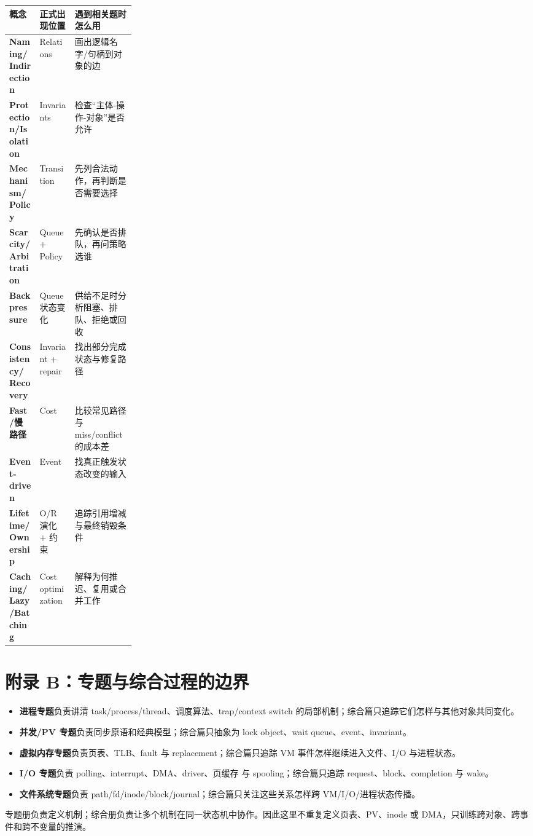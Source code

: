 \documentclass[11pt,a4paper]{ctexart}
\newcommand{\kw}[1]{\textbf{#1}}
\begin{document}
\begin{center}
\small
\begin{tabularx}{\linewidth}{>{\bfseries}p{0.24\linewidth} X X}
\toprule
概念 & 正式出现位置 & 遇到相关题时怎么用 \\
\midrule
Naming/Indirection & Relations & 画出逻辑名字/句柄到对象的边 \\
Protection/Isolation & Invariants & 检查“主体-操作-对象”是否允许 \\
Mechanism/Policy & Transition & 先列合法动作，再判断是否需要选择 \\
Scarcity/Arbitration & Queue + Policy & 先确认是否排队，再问策略选谁 \\
Backpressure & Queue 状态变化 & 供给不足时分析阻塞、排队、拒绝或回收 \\
Consistency/Recovery & Invariant + repair & 找出部分完成状态与修复路径 \\
Fast/慢路径 & Cost & 比较常见路径与 miss/conflict 的成本差 \\
Event-driven & Event & 找真正触发状态改变的输入 \\
Lifetime/Ownership & O/R 演化 + 约束 & 追踪引用增减与最终销毁条件 \\
Caching/Lazy/Batching & Cost optimization & 解释为何推迟、复用或合并工作 \\
\bottomrule
\end{tabularx}
\end{center}

\section{附录 B：专题与综合过程的边界}

\begin{itemize}
  \item \kw{进程专题}负责讲清 task/process/thread、调度算法、trap/context switch 的局部机制；综合篇只追踪它们怎样与其他对象共同变化。
  \item \kw{并发/PV 专题}负责同步原语和经典模型；综合篇只抽象为 lock object、wait queue、event、invariant。
  \item \kw{虚拟内存专题}负责页表、TLB、fault 与 replacement；综合篇只追踪 VM 事件怎样继续进入文件、I/O 与进程状态。
  \item \kw{I/O 专题}负责 polling、interrupt、DMA、driver、页缓存 与 spooling；综合篇只追踪 request、block、completion 与 wake。
  \item \kw{文件系统专题}负责 path/fd/inode/block/journal；综合篇只关注这些关系怎样跨 VM/I/O/进程状态传播。
\end{itemize}

\begin{method}[使用边界]
专题册负责定义机制；综合册负责让多个机制在同一状态机中协作。因此这里不重复定义页表、PV、inode 或 DMA，只训练跨对象、跨事件和跨不变量的推演。
\end{method}
\end{document}
